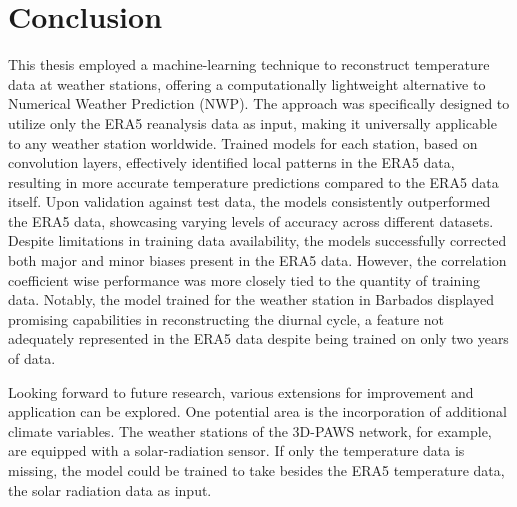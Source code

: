 \section{Conclusion}
\label{sec: conclusion}

This thesis employed a machine-learning technique to reconstruct temperature data at weather stations, offering a computationally lightweight alternative to Numerical Weather Prediction (NWP).
The approach was specifically designed to utilize only the ERA5 reanalysis data as input, making it universally applicable to any weather station worldwide.
Trained models for each station, based on convolution layers, effectively identified local patterns in the ERA5 data, resulting in more accurate temperature predictions compared to the ERA5 data itself.
Upon validation against test data, the models consistently outperformed the ERA5 data, showcasing varying levels of accuracy across different datasets.
Despite limitations in training data availability, the models successfully corrected both major and minor biases present in the ERA5 data. However, the correlation coefficient wise performance was more closely tied to the quantity of training data.
Notably, the model trained for the weather station in Barbados displayed promising capabilities in reconstructing the diurnal cycle, a feature not adequately represented in the ERA5 data despite being trained on only two years of data.

Looking forward to future research, various extensions for improvement and application can be explored.
One potential area is the incorporation of additional climate variables.
The weather stations of the 3D-PAWS network, for example, are equipped with a solar-radiation sensor. If only the temperature data is missing, the model could be trained to take besides the ERA5 temperature data, the solar radiation data as input. 

